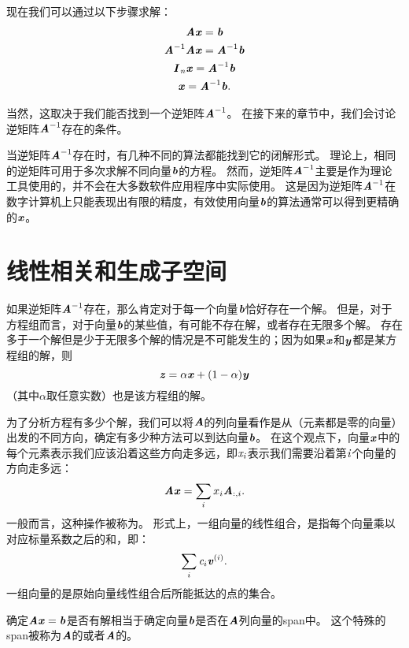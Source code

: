 现在我们可以通过以下步骤求解：
\begin{gather}
\MA\Vx=\Vb \\
\MA^{-1}\MA\Vx = \MA^{-1}\Vb \\
\MI_{\Sn} \Vx=\MA^{-1}\Vb \\
\Vx=\MA^{-1}\Vb. 
\end{gather}


当然，这取决于我们能否找到一个逆矩阵$\MA^{-1}$。
在接下来的章节中，我们会讨论逆矩阵$\MA^{-1}$存在的条件。


当逆矩阵$\MA^{-1}$存在时，有几种不同的算法都能找到它的闭解形式。
理论上，相同的逆矩阵可用于多次求解不同向量$\Vb$的方程。
然而，逆矩阵$\MA^{-1}$主要是作为理论工具使用的，并不会在大多数软件应用程序中实际使用。
这是因为逆矩阵$\MA^{-1}$在数字计算机上只能表现出有限的精度，有效使用向量$\Vb$的算法通常可以得到更精确的$\Vx$。





\section{线性相关和生成子空间}
\label{sec:linear_dependence_and_span}

如果逆矩阵$\MA^{-1}$存在，那么肯定对于每一个向量$\Vb$恰好存在一个解。
但是，对于方程组而言，对于向量$\Vb$的某些值，有可能不存在解，或者存在无限多个解。
存在多于一个解但是少于无限多个解的情况是不可能发生的；因为如果$\Vx$和$\Vy$都是某方程组的解，则
\begin{equation}
\Vz=\alpha \Vx + (1-\alpha) \Vy
\end{equation}
（其中$\alpha$取任意实数）也是该方程组的解。


为了分析方程有多少个解，我们可以将$\MA$的列向量看作是从（元素都是零的向量）出发的不同方向，确定有多少种方法可以到达向量$\Vb$。
在这个观点下，向量$\Vx$中的每个元素表示我们应该沿着这些方向走多远，即$\Sx_{\Si}$表示我们需要沿着第$\Si$个向量的方向走多远：
\begin{equation}
\MA \Vx = \sum_i x_i \MA_{:,i}.
\end{equation}
一般而言，这种操作被称为。
形式上，一组向量的线性组合，是指每个向量乘以对应标量系数之后的和，即：
\begin{equation}
    \sum_i \Sc_i \Vv^{(i)}.
\end{equation}
一组向量的是原始向量线性组合后所能抵达的点的集合。


确定$\MA\Vx=\Vb$是否有解相当于确定向量$\Vb$是否在$\MA$列向量的\gls{span}中。
这个特殊的\gls{span}被称为$\MA$的或者$\MA$的。


